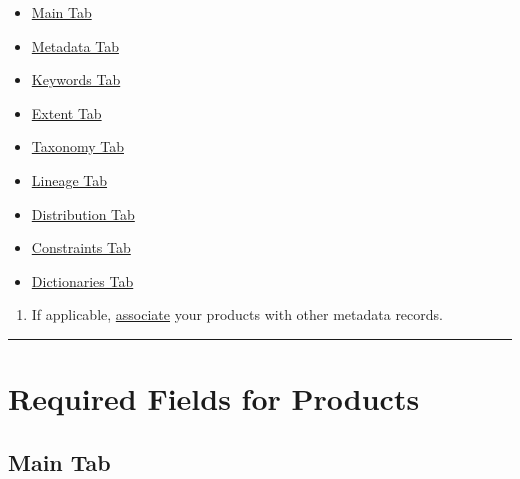\documentclass[
]{book}
\providecommand{\tightlist}{%
  \setlength{\itemsep}{0pt}\setlength{\parskip}{0pt}}
\begin{document}
\begin{itemize}
\tightlist
\item
  \protect\hyperlink{product-main}{Main Tab}
\item
  \protect\hyperlink{product-metadata}{Metadata Tab}
\item
  \protect\hyperlink{product-keywords}{Keywords Tab}
\item
  \protect\hyperlink{product-extent}{Extent Tab}
\item
  \protect\hyperlink{product-taxonomy}{Taxonomy Tab}
\item
  \protect\hyperlink{product-lineage}{Lineage Tab}
\item
  \protect\hyperlink{product-distribution}{Distribution Tab}
\item
  \protect\hyperlink{product-constaints}{Constraints Tab}
\item
  \protect\hyperlink{product-dictionary}{Dictionaries Tab}
\end{itemize}

\begin{enumerate}
\def\labelenumi{\arabic{enumi}.}
\setcounter{enumi}{4}
\tightlist
\item
  If applicable, \protect\hyperlink{product-associated}{associate} your products with other metadata records.
\end{enumerate}

\begin{center}\rule{0.5\linewidth}{\linethickness}\end{center}

\hypertarget{required-fields-for-products}{%
\section{Required Fields for Products}\label{required-fields-for-products}}

\hypertarget{main-tab-2}{%
\subsection{Main Tab}\label{main-tab-2}}
\end{document}
